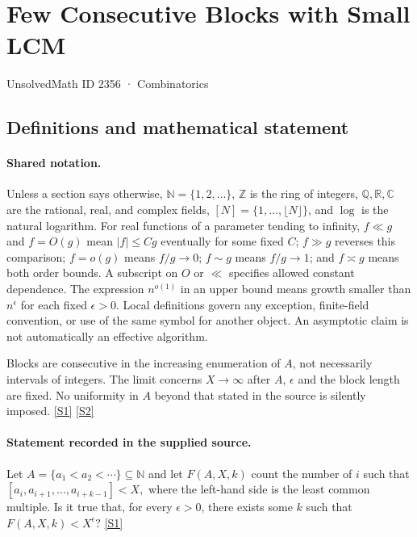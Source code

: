 \documentclass[11pt,a4paper]{article}
\newcommand{\N}{\mathbb{N}}
\newcommand{\Z}{\mathbb{Z}}
\newcommand{\Q}{\mathbb{Q}}
\newcommand{\R}{\mathbb{R}}
\newcommand{\C}{\mathbb{C}}
\newcommand{\sref}[2]{\hyperlink{source:#1:#2}{[S#2]}}
\begin{document}

\setcounter{section}{2355}

\section{Few Consecutive Blocks with Small LCM}\label{2356}

{\small\sffamily UnsolvedMath ID 2356 · Combinatorics}

\subsection{Definitions and mathematical statement}

\paragraph{Shared notation.}Unless a section says otherwise, $\N=\{1,2,\ldots\}$,
$\Z$ is the ring of integers, $\Q,\R,\C$ are the rational, real, and complex
fields, $[N]=\{1,\ldots,\lfloor N\rfloor\}$, and $\log$ is the natural
logarithm. For real functions of a parameter tending to infinity,
$f\ll g$ and $f=O(g)$ mean $|f|\leq Cg$ eventually for some fixed $C$;
$f\gg g$ reverses this comparison; $f=o(g)$ means $f/g\to0$;
$f\sim g$ means $f/g\to1$; and $f\asymp g$ means both order bounds.
A subscript on $O$ or $\ll$ specifies allowed constant dependence.
The expression $n^{o(1)}$ in an upper bound means growth smaller than
$n^\epsilon$ for each fixed $\epsilon>0$. Local definitions govern any
exception, finite-field convention, or use of the same symbol for another
object. An asymptotic claim is not automatically an effective algorithm.



Blocks are consecutive in the increasing enumeration of $A$, not necessarily intervals of integers. The limit concerns $X\to\infty$ after $A$, $\epsilon$ and the block length are fixed. No uniformity in $A$ beyond that stated in the source is silently imposed. \sref{2356}{1} \sref{2356}{2}

\paragraph{Statement recorded in the supplied source.}
Let $A=\{a_1<a_2<\cdots\}\subseteq \mathbb{N}$ and let $F(A,X,k)$ count the number of $i$ such that $ [a_i,a_{i+1},\ldots,a_{i+k-1}] < X, $ where the left-hand side is the least common multiple. Is it true that, for every $\epsilon >0$, there exists some $k$ such that $ F(A,X,k)<X^\epsilon? $ \sref{2356}{1}
\end{document}
